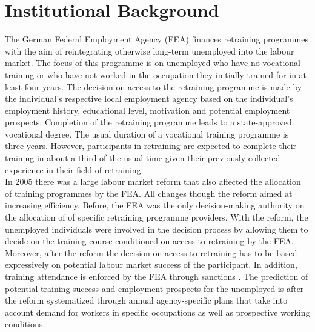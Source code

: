 
\section{Institutional Background}\label{sec:inst}
The German Federal Employment Agency (FEA) finances retraining programmes with the aim of reintegrating otherwise long-term unemployed into the labour market. The focus of this programme is on unemployed who have no vocational training or who have not worked in the occupation they initially trained for in at least four years. The decision on access to the retraining programme is made by the individual's respective local employment agency based on the individual's employment history, educational level, motivation and potential employment prospects. Completion of the retraining programme leads to a state-approved vocational degree. The usual duration of a vocational training programme is three years. However, participants in retraining are expected to complete their training in about a third of the usual time given their previously collected experience in their field of retraining.\\

In 2005 there was a large labour market reform that also affected the allocation of training programmes by the FEA. All changes though the reform aimed at increasing efficiency. Before, the FEA was the only decision-making authority on the allocation of of specific retraining programme providers. With the reform, the unemployed individuals were involved in the decision process by allowing them to decide on the training course conditioned on access to retraining by the FEA. Moreover, after the reform the decision on access to retraining has to be based expressively on potential labour market success of the participant. In addition, training attendance is enforced by the FEA through sanctions \citep{Doerr2017}. The prediction of potential training success and employment prospects for the unemployed is after the reform systematized through annual agency-specific plans that take into account demand for workers in specific occupations as well as prospective working conditions. 